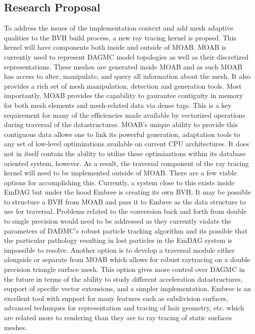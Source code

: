 \documentclass[12pt, a4paper]{article}
\begin{document}
\subsection{Research Proposal}%

To address the issues of the implementation context and add mesh adaptive qualities to the BVH build process, a new ray tracing kernel is propsed. This kernel will have components both inside and outside of MOAB. MOAB is currently used to represent DAGMC model topologies as well as their discretized representations. These meshes are generated inside MOAB and as such MOAB has access to alter, manipulate, and query all information about the mesh. It also provides a rich set of mesh manipulation, detection and generation tools. Most importantly, MOAB provides the capability to gaurantee contiguity in memory for both mesh elements and mesh-related data via dense tags. This is a key requirement for many of the efficiencies made available by vectorized operations during traversal of the datastructures. MOAB's unique ability to provide this contiguous data allows one to link its powerful generation, adaptation tools to any set of low-level optimizations available on current CPU architectures. It does not in itself contain the ability to utilize these optimiaztions within its database oriented system, however. As a result, the traversal component of the ray tracing kernel will need to be implemented outside of MOAB. There are a few viable options for accomplishing this. Currently, a system close to this exists inside EmDAG but under the hood Embree is creating its own BVH. It may be possible to structure a BVH from MOAB and pass it to Embree as the data structure to use for traversal. Problems related to the conversion back and forth from double to single precision would need to be addressed as they currently violate the parameters of DADMC's robust particle tracking algorithm and its possible that the particular pathology resulting in lost particles in the EmDAG system is impossible to resolve. Another option is to develop a traversal module either alongside or separate from MOAB which allows for robust raytracing on a double precision triangle surface mesh. This option gives more control over DAGMC in the future in terms of the ability to study different acceleration datastructures, support of specific vector extensions, and a simpler implementation. Embree is an excellent tool with support for many features such as subdivision surfaces, advanced techniques for representation and tracing of hair geometry, etc. which are related more to rendering than they are to ray tracing of static surfaces meshes. 
\end{document}
